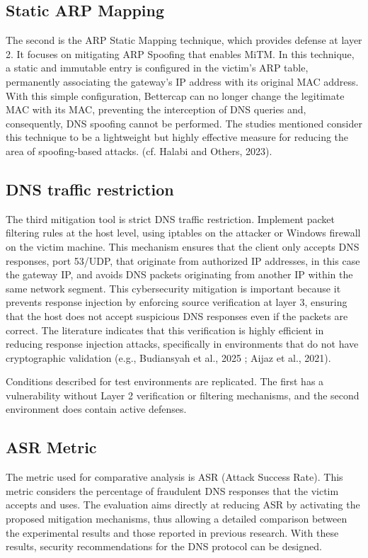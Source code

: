 \documentclass[conference]{IEEEtran}
\begin{document}
\subsection{Static ARP Mapping}
The second is the ARP Static Mapping technique, which provides defense at layer 2. It focuses on mitigating ARP Spoofing that enables MiTM. In this technique, a static and immutable entry is configured in the victim's ARP table, permanently associating the gateway's IP address with its original MAC address. With this simple configuration, Bettercap can no longer change the legitimate MAC with its MAC, preventing the interception of DNS queries and, consequently, DNS spoofing cannot be performed. The studies mentioned consider this technique to be a lightweight but highly effective measure for reducing the area of spoofing-based attacks. (cf. Halabi and Others, 2023). \cite{b9}

\subsection{DNS traffic restriction}
The third mitigation tool is strict DNS traffic restriction. Implement packet filtering rules at the host level, using iptables on the attacker or Windows firewall on the victim machine. This mechanism ensures that the client only accepts DNS responses, port 53/UDP, that originate from authorized IP addresses, in this case the gateway IP, and avoids DNS packets originating from another IP within the same network segment. This cybersecurity mitigation is important because it prevents response injection by enforcing source verification at layer 3, ensuring that the host does not accept suspicious DNS responses even if the packets are correct. The literature indicates that this verification is highly efficient in reducing response injection attacks, specifically in environments that do not have cryptographic validation (e.g., Budiansyah et al., 2025 \cite{b1}; Aijaz et al., 2021). \cite{b2}

Conditions described for test environments are replicated. The first has a vulnerability without Layer 2 verification or filtering mechanisms, and the second environment does contain active defenses.

\subsection{ASR Metric}
The metric used for comparative analysis is ASR (Attack Success Rate). This metric considers the percentage of fraudulent DNS responses that the victim accepts and uses. The evaluation aims directly at reducing ASR by activating the proposed mitigation mechanisms, thus allowing a detailed comparison between the experimental results and those reported in previous research. With these results, security recommendations for the DNS protocol can be designed.
\end{document}
